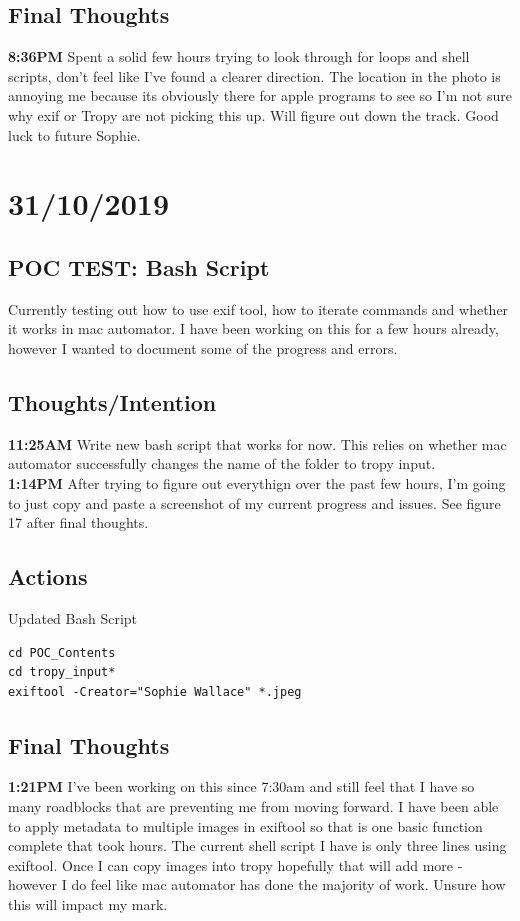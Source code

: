 \documentclass{article}
\begin{document}
\subsection{Final Thoughts}
\textbf{8:36PM} Spent a solid few hours trying to look through for loops and shell scripts, don't feel like I've found a clearer direction. The location in the photo is annoying me because its obviously there for apple programs to see so I'm not sure why exif or Tropy are not picking this up. Will figure out down the track. Good luck to future Sophie. 

\section{31/10/2019}
\subsection{POC TEST: Bash Script}
Currently testing out how to use exif tool, how to iterate commands and whether it works in mac automator. I have been working on this for a few hours already, however I wanted to document some of the progress and errors.
\subsection{Thoughts/Intention}
\textbf{11:25AM} Write new bash script that works for now. This relies on whether mac automator successfully changes the name of the folder to tropy input. \\
\textbf{1:14PM} After trying to figure out everythign over the past few hours, I'm going to just copy and paste a screenshot of my current progress and issues. See figure 17 after final thoughts.

\subsection{Actions}
Updated Bash Script
\begin{verbatim}
cd POC_Contents
cd tropy_input*
exiftool -Creator="Sophie Wallace" *.jpeg
\end{verbatim}

\subsection{Final Thoughts}
\textbf{1:21PM} I've been working on this since 7:30am and still feel that I have so many roadblocks that are preventing me from moving forward. I have been able to apply metadata to multiple images in exiftool so that is one basic function complete that took hours. The current shell script I have is only three lines using exiftool. Once I can copy images into tropy hopefully that will add more - however I do feel like mac automator has done the majority of work. Unsure how  this will impact my mark. 
\end{document}
